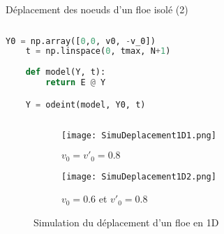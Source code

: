 \begin{frame}[fragile]{Déplacement des noeuds d’un floe isolé (2)}

    \begin{columns}[onlytextwidth]

        \begin{column}{0.5\textwidth}
            \begin{lstlisting}[language=Python,caption=Code de simulation 1D]
    Y0 = np.array([0,0, v0, -v_0])
    t = np.linspace(0, tmax, N+1)
    
    def model(Y, t):
        return E @ Y

    Y = odeint(model, Y0, t)
            \end{lstlisting}
        \end{column}

    \end{columns}
    

    
    \begin{figure}[!h]
        \centering
        \begin{subfigure}[t]{0.45\textwidth}
            \centering
            \texttt{[image: SimuDeplacement1D1.png]}
            \caption{$v_0=v'_0 = 0.8$}
        \end{subfigure}
        \begin{subfigure}[t]{0.45\textwidth}
            \centering
            \texttt{[image: SimuDeplacement1D2.png]}
            \caption{$v_0= 0.6$ et $v'_0 = 0.8$}
        \end{subfigure}    
        \caption{Simulation du déplacement d'un floe en 1D}
    \end{figure}

\end{frame}



